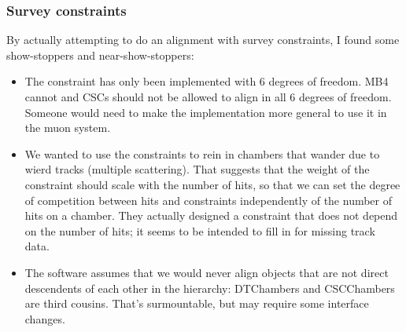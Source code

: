 \documentclass[compress]{beamer}
\begin{document}
\begin{frame}
\frametitle{Survey constraints}

\small
By actually attempting to do an alignment with survey constraints, I found some show-stoppers and near-show-stoppers:
\begin{itemize}
\item The constraint has only been implemented with 6 degrees of
freedom.  MB4 cannot and CSCs should not be allowed to align in all 6
degrees of freedom.  Someone would need to make the implementation
more general to use it in the muon system.
\item We wanted to use the constraints to rein in chambers that wander
due to wierd tracks (multiple scattering).  That suggests that the
weight of the constraint should scale with the number of hits, so that
we can set the degree of competition between hits and constraints
independently of the number of hits on a chamber.  They actually
designed a constraint that does not depend on the number of hits; it
seems to be intended to fill in for missing track data.
\item The software assumes that we would never align objects that are
not direct descendents of each other in the hierarchy: DTChambers and
CSCChambers are third cousins.  That's surmountable, but may require
some interface changes.
\end{itemize}

\end{frame}




\end{document}
